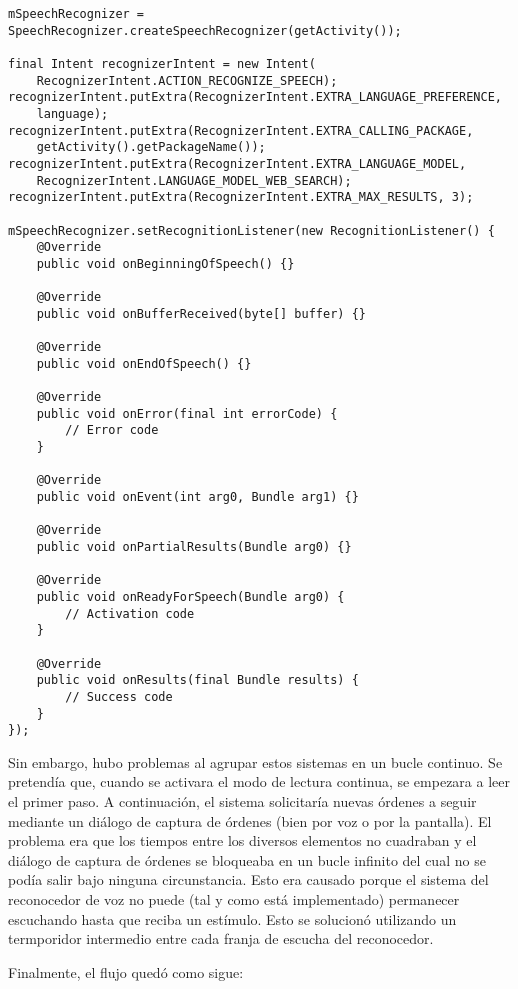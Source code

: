 \begin{verbatim}
mSpeechRecognizer = SpeechRecognizer.createSpeechRecognizer(getActivity());

final Intent recognizerIntent = new Intent(
    RecognizerIntent.ACTION_RECOGNIZE_SPEECH);
recognizerIntent.putExtra(RecognizerIntent.EXTRA_LANGUAGE_PREFERENCE,
    language);
recognizerIntent.putExtra(RecognizerIntent.EXTRA_CALLING_PACKAGE,
    getActivity().getPackageName());
recognizerIntent.putExtra(RecognizerIntent.EXTRA_LANGUAGE_MODEL,
    RecognizerIntent.LANGUAGE_MODEL_WEB_SEARCH);
recognizerIntent.putExtra(RecognizerIntent.EXTRA_MAX_RESULTS, 3);

mSpeechRecognizer.setRecognitionListener(new RecognitionListener() {
    @Override
    public void onBeginningOfSpeech() {}

    @Override
    public void onBufferReceived(byte[] buffer) {}

    @Override
    public void onEndOfSpeech() {}

    @Override
    public void onError(final int errorCode) {
        // Error code
    }

    @Override
    public void onEvent(int arg0, Bundle arg1) {}

    @Override
    public void onPartialResults(Bundle arg0) {}

    @Override
    public void onReadyForSpeech(Bundle arg0) {
        // Activation code
    }

    @Override
    public void onResults(final Bundle results) {
        // Success code
    }
});
\end{verbatim}

Sin embargo, hubo problemas al agrupar estos sistemas en un bucle continuo. Se
pretendía que, cuando se activara el modo de lectura continua, se empezara a
leer el primer paso. A continuación, el sistema solicitaría nuevas órdenes a
seguir mediante un diálogo de captura de órdenes (bien por voz o por la
pantalla). El problema era que los tiempos entre los diversos elementos no
cuadraban y el diálogo de captura de órdenes se bloqueaba en un bucle infinito
del cual no se podía salir bajo ninguna circunstancia. Esto era causado porque
el sistema del reconocedor de voz no puede (tal y como está implementado)
permanecer escuchando hasta que reciba un estímulo. Esto se solucionó utilizando
un termporidor intermedio entre cada franja de escucha del reconocedor.

Finalmente, el flujo quedó como sigue:

